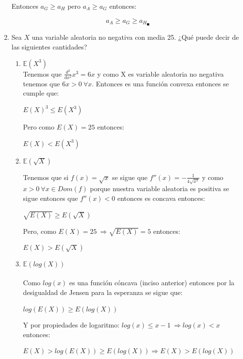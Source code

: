 \documentclass[12pt,a4paper]{report}
\begin{document}
\begin{enumerate}
{\begin{center}
		      \end{center}
		      Entonces $a_{G}\geq a_{H}$ pero $a_{A}\geq a_{G}$ entonces:\\
		      \begin{center}
		          $$a_{A}\geq a_{G} \geq a_{H}_{\blacksquare}$$
		      \end{center}

 		}

		\item{
			Sea $X$ una variable aleatoria no negativa con media 25. ¿Qué puede
			decir de las siguientes cantidades?
			\begin{enumerate}
				\item {
					$\mathbb{E}(X^3)$ \\

				Tenemos que $\frac{d^2}{dx^2}x^3=6x$ y como X es variable aleatoria no negativa tenemos que $6x>0 \ \forall x$. Entonces es una función convexa entonces se cumple que:\\
				\begin{center}
				    $E(X)^3 \leq E(X^3)$
				\end{center}
				Pero como $E(X)=25$ entonces:\\
				\begin{center}
				    $E(X)< E(X^3)$
				\end{center}

				}


				\item {
					$\mathbb{E}(\sqrt{X})$

				Tenemos que si $f(x)=\sqrt{x}$ se sigue que $f''(x)=-\frac{1}{4\sqrt{x^3}}$ y como $x>0 \ \forall x\in Dom(f)$ porque nuestra variable aleatoria es positiva se sigue entonces que $f''(x)<0$ entonces es concava entonces:\\
				\begin{center}
				    $\sqrt{E(X)}\geq E(\sqrt{X})$
				\end{center}
				Pero, como $E(X)=25 \ \Rightarrow \sqrt{E(X)}=5$ entonces:\\
				\begin{center}
				    $E(X) > E(\sqrt{X})$
				\end{center}

				}

				\item {
					$\mathbb{E}(log(X))$\\ \\
					Como $log(x)$ es una función cóncava (inciso anterior) entonces por la desigualdad de Jensen para la esperanza se sigue que:\\
					\begin{center}
					    $log(E(X))\geq E(log(X))$
					\end{center}
					Y por propiedades de logaritmo: $log(x)\leq x-1 \ \Rightarrow log(x) < x$ entonces:\\
					\begin{center}
					    $E(X)> log(E(X)) \geq E(log(X)) \Rightarrow E(X) > E(log(X))$
					\end{center}
				}


\end{enumerate}}
\end{enumerate}
\end{document}
